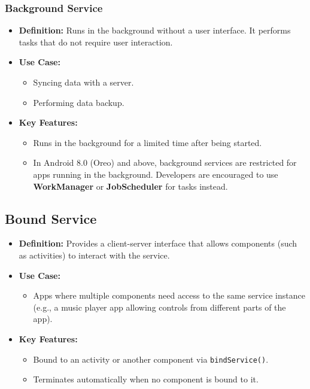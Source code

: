 \documentclass[12pt]{article}
\begin{document}
\begin{itemize}
    \subsubsection{ Background Service}
    \begin{itemize}[leftmargin=*]
        \item \textbf{Definition:} Runs in the background without a user interface. It performs tasks that do not require user interaction.
        \item \textbf{Use Case:}
        \begin{itemize}
            \item Syncing data with a server.
            \item Performing data backup.
        \end{itemize}
        \item \textbf{Key Features:}
        \begin{itemize}
            \item Runs in the background for a limited time after being started.
            \item In Android 8.0 (Oreo) and above, background services are restricted for apps running in the background. Developers are encouraged to use \textbf{WorkManager} or \textbf{JobScheduler} for tasks instead.
        \end{itemize}
    \end{itemize}
    
    \subsection{Bound Service}
    \begin{itemize}[leftmargin=*]
        \item \textbf{Definition:} Provides a client-server interface that allows components (such as activities) to interact with the service.
        \item \textbf{Use Case:}
        \begin{itemize}
            \item Apps where multiple components need access to the same service instance (e.g., a music player app allowing controls from different parts of the app).
        \end{itemize}
        \item \textbf{Key Features:}
        \begin{itemize}
            \item Bound to an activity or another component via \texttt{bindService()}.
            \item Terminates automatically when no component is bound to it.
        \end{itemize}
    \end{itemize}
    

\end{itemize}
\end{document}
